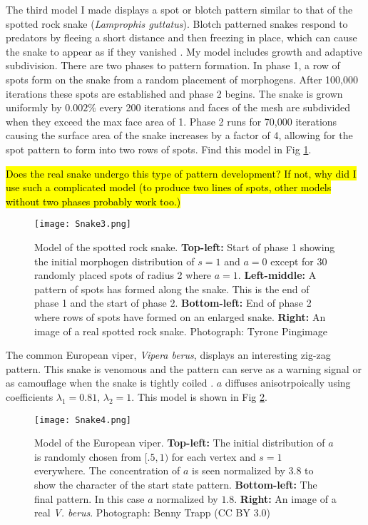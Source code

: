 The third model I made displays a spot or blotch pattern similar to that of the spotted rock snake (\textit{Lamprophis guttatus}). Blotch patterned snakes respond to predators by fleeing a short distance and then freezing in place, which can cause the snake to appear as if they vanished \citep{lillywhite2014}. 
My model includes growth and adaptive subdivision. There are two phases to pattern formation. In phase 1, a row of spots form on the snake from a random placement of morphogens. After 100,000 iterations these spots are established and phase 2 begins. The snake is grown uniformly by $0.002\%$ every 200 iterations and faces of the mesh are subdivided when they exceed the max face area of 1. Phase 2 runs for 70,000 iterations causing the surface area of the snake increases by a factor of 4, allowing for the spot pattern to form into two rows of spots. Find this model in Fig \ref{fig:Snake3}.

\hl{Does the real snake undergo this type of pattern development? If not, why did I use such a complicated model (to produce two lines of spots, other models without two phases probably work too.)}

\begin{figure}[ht]
	\centering
	\texttt{[image: Snake3.png]}
	\caption{Model of the spotted rock snake. \textbf{Top-left:} Start of phase 1 showing the initial morphogen distribution of $s=1$ and $a=0$ except for 30 randomly placed spots of radius 2 where $a=1$. \textbf{Left-middle:} A pattern of spots has formed along the snake. This is the end of phase 1 and the start of phase 2. \textbf{Bottom-left:} End of phase 2 where rows of spots have formed on an enlarged snake. \textbf{Right:} An image of a real spotted rock snake. \textcolor{citation-gray}{Photograph: Tyrone Pingimage}}
	\label{fig:Snake3}
\end{figure}

The common European viper, \textit{Vipera berus}, displays an interesting zig-zag pattern. This snake is venomous and the pattern can serve as a warning signal or as camouflage when the snake is tightly coiled \citep{lillywhite2014}. $a$ diffuses anisotrpoically using coefficients $\lambda_{1}=0.81$, $\lambda_{2}=1$. This model is shown in Fig \ref{fig:Snake4}.

\newpage 

\begin{figure}[ht]
	\centering
	\texttt{[image: Snake4.png]}
	\caption{Model of the European viper. \textbf{Top-left:} The initial distribution of $a$ is randomly chosen from $[.5, 1)$ for each vertex and $s=1$ everywhere. The concentration of $a$ is seen normalized by 3.8 to show the character of the start state pattern. \textbf{Bottom-left:} The final pattern. In this case $a$ normalized by $1.8$. \textbf{Right:} An image of a real \textit{V. berus}. \textcolor{citation-gray}{Photograph: Benny Trapp (CC BY 3.0)}}
	\label{fig:Snake4}
\end{figure}

